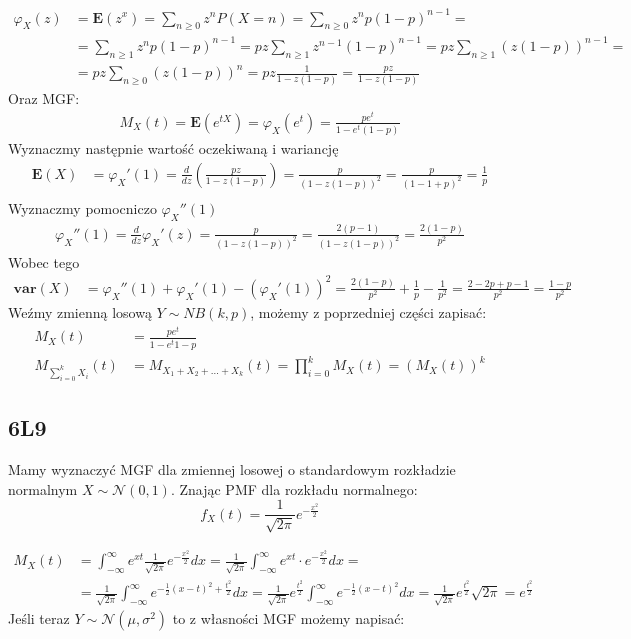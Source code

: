\documentclass{article}
\numberwithin{equation}{subsection}
\begin{document}
\begin{align}
    \varphi_X(z) &= \mathbf{E}(z^x) = \sum_{n\geq 0} z^n P(X=n) = \sum_{n\geq 0} z^n p(1-p)^{n-1} =\\
    &= \sum_{n\geq 1} z^n p(1-p)^{n-1} = pz \sum_{n\geq 1} z^{n-1} (1-p)^{n-1} = pz \sum_{n\geq 1} (z(1-p))^{n-1} =\\
    &= pz \sum_{n\geq 0} (z(1-p))^n
    = pz \frac{1}{1-z(1-p)} = \frac{pz}{1-z(1-p)} 
\end{align}
Oraz MGF:
\begin{align}
    M_X(t) = \mathbf{E}(e^{tX}) = \varphi_X(e^t) = \frac{pe^t}{1-e^t(1-p)}
\end{align}
Wyznaczmy następnie wartość oczekiwaną i wariancję
\begin{align}
    \mathbf{E}(X) &= \varphi_X'(1) = \frac{d}{dz} (\frac{pz}{1-z(1-p)}) = \frac{p}{(1-z(1-p))^2} = \frac{p}{(1-1+p)^2} = \frac{1}{p}\\
\end{align}
Wyznaczmy pomocniczo $\varphi_X''(1)$
\begin{align}
    \varphi_X''(1) = \frac{d}{dz} \varphi_X'(z) = \frac{p}{(1-z(1-p))^2} = \frac{2(p-1)}{(1-z(1-p))^2} = \frac{2(1-p)}{p^2}
\end{align}
Wobec tego
\begin{align}
    \mathbf{var}(X) &= \varphi_X''(1) + \varphi_X'(1) - (\varphi_X'(1))^2 = \frac{2(1-p)}{p^2} + \frac{1}{p} - \frac{1}{p^2} = \frac{2-2p+p-1}{p^2} = \frac{1-p}{p^2}
\end{align}
Weźmy zmienną losową $Y\sim NB(k,p)$, możemy z poprzedniej części zapisać:
\begin{align}
    M_X(t) &= \frac{pe^t}{1-e^t{1-p}}\\
    M_{\sum_{i=0}^{k} X_i} (t) &= M_{X_1+X_2+\dots+X_k}(t) = \prod_{i=0}^{k} M_X(t) = (M_X(t))^k
\end{align}

\subsection{6L9}

Mamy wyznaczyć MGF dla zmiennej losowej o standardowym rozkładzie normalnym $X\sim\mathcal{N}(0,1)$. Znając PMF dla rozkładu normalnego:
\[
    f_X(t) = \frac{1}{\sqrt{2\pi}} e^{-\frac{x^2}{2}}
\]

\begin{align}
    M_X(t) &= \int_{-\infty}^{\infty} e^{xt} \frac{1}{\sqrt{2\pi}} e^{-\frac{x^2}{2}} dx =
    \frac{1}{\sqrt{2\pi}} \int_{-\infty}^{\infty} e^{xt}\cdot e^{-\frac{x^2}{2}} dx =\\
    &= \frac{1}{\sqrt{2\pi}} \int_{-\infty}^{\infty} e^{-\frac{1}{2}(x-t)^2 + \frac{t^2}{2}} dx =
    \frac{1}{\sqrt{2\pi}} e^{\frac{t^2}{2}} \int_{-\infty}^{\infty} e^{-\frac{1}{2}(x-t)^2} dx =
    \frac{1}{\sqrt{2\pi}} e^{\frac{t^2}{2}} \sqrt{2\pi} = e^{\frac{t^2}{2}} 
\end{align}
Jeśli teraz $Y\sim\mathcal{N}(\mu, \sigma^2)$ to z własności MGF możemy napisać:
\end{document}
